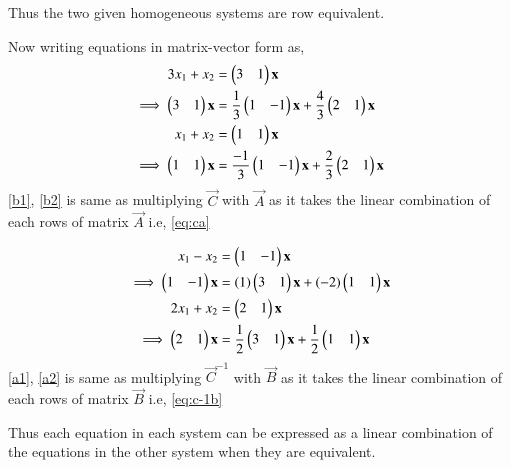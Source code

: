 \documentclass[journal,12pt,twocolumn]{IEEEtran}
\begin{document}
Thus the two given homogeneous systems are row equivalent.

Now writing equations in matrix-vector form as, 
\begin{align}
    3x_1 + x_2 &= \begin{pmatrix}3&1\end{pmatrix}\mathbf{x} \\
    \implies \begin{pmatrix}3&1\end{pmatrix}\mathbf{x} &= \frac{1}{3}\begin{pmatrix}1&-1\end{pmatrix}\mathbf{x} + \frac{4}{3}\begin{pmatrix}2&1\end{pmatrix}\mathbf{x} \label{b1}\\
    x_1 + x_2 &= \begin{pmatrix}1&1\end{pmatrix}\mathbf{x} \\
    \implies \begin{pmatrix}1&1\end{pmatrix}\mathbf{x} &= \frac{-1}{3}\begin{pmatrix}1&-1\end{pmatrix}\mathbf{x} + 
    \frac{2}{3}\begin{pmatrix}2&1\end{pmatrix}\mathbf{x} \label{b2}
\end{align}
\eqref{b1}, \eqref{b2} is same as multiplying $\vec{C}$ with $\vec{A}$ as it takes the linear combination of each rows of matrix $\vec{A}$ i.e, \eqref{eq:ca}

\begin{align}
    x_1 - x_2 &= \begin{pmatrix}1&-1\end{pmatrix}\mathbf{x} \\
    \implies\begin{pmatrix}1&-1\end{pmatrix}\mathbf{x} &= (1)\begin{pmatrix}3&1\end{pmatrix}\mathbf{x} + (-2)\begin{pmatrix}1&1\end{pmatrix}\mathbf{x} \label{a1}\\
    2x_1 + x_2 &= \begin{pmatrix}2&1\end{pmatrix}\mathbf{x} \\
    \implies \begin{pmatrix}2&1\end{pmatrix}\mathbf{x} &= \frac{1}{2}\begin{pmatrix}3&1\end{pmatrix}\mathbf{x} + \frac{1}{2}\begin{pmatrix}1&1\end{pmatrix}\mathbf{x} \label{a2}
\end{align}
\eqref{a1}, \eqref{a2} is same as multiplying $\vec{C}^{-1}$ with $\vec{B}$ as it takes the linear combination of each rows of matrix $\vec{B}$ i.e, \eqref{eq:c-1b}

Thus each equation in each system can be expressed as a linear combination of the equations in the other system when they are equivalent. 
\end{document}
